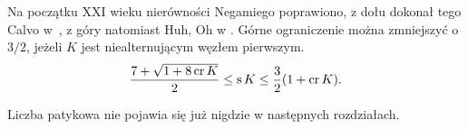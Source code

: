 Na początku XXI wieku nierówności Negamiego poprawiono, z dołu dokonał tego Calvo w~\cite{calvo01}, z góry natomiast Huh, Oh w \cite{huh11}.
%
%
%
Górne ograniczenie można zmniejszyć o $3/2$, jeżeli $K$ jest niealternującym węzłem pierwszym.
\begin{equation}
    \frac{7+\sqrt{1 + 8 \operatorname{cr} K}}{2} \le \operatorname{s} K \le \frac{3}{2} (1 + \operatorname{cr} K).
\end{equation}

Liczba patykowa nie pojawia się już nigdzie w następnych rozdziałach.




